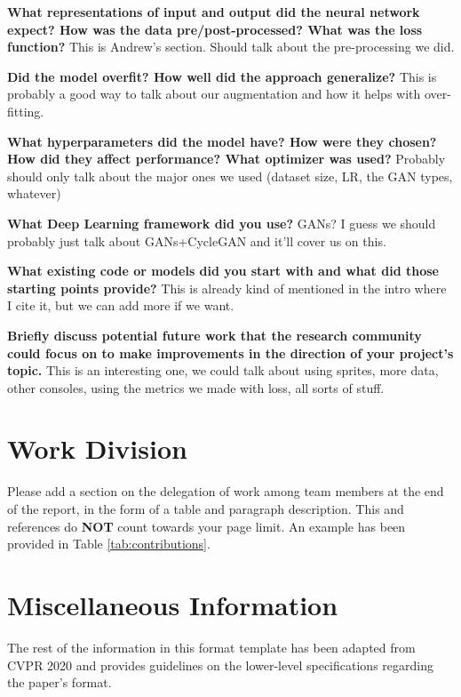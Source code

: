\documentclass[10pt,twocolumn,letterpaper]{article}
\begin{document}
\textbf{What representations of input and output did the neural network expect? How was the data pre/post-processed?
   What was the loss function?}
This is Andrew's section. Should talk about the pre-processing we did.

\textbf{Did the model overfit? How well did the approach generalize?}
This is probably a good way to talk about our augmentation and how it helps with over-fitting.

\textbf{What hyperparameters did the model have? How were they chosen? How did they affect performance? What optimizer was used?}
Probably should only talk about the major ones we used (dataset size, LR, the GAN types, whatever)

\textbf{What Deep Learning framework did you use?}
GANs? I guess we should probably just talk about GANs+CycleGAN and it'll cover us on this.

\textbf{What existing code or models did you start with and what did those starting points provide?}
This is already kind of mentioned in the intro where I cite it, but we can add more if we want.

\textbf{Briefly discuss potential future work that the research community could focus on to make improvements in the direction of your project's topic.}
This is an interesting one, we could talk about using sprites, more data, other consoles, using the metrics we made with loss, all sorts of stuff.


\section{Work Division}

Please add a section on the delegation of work among team members at the end of the report, in the form of a table and paragraph description. This and references do \textbf{NOT} count towards your page limit. An example has been provided in Table \ref{tab:contributions}.

\newpage
\newpage
\section{Miscellaneous Information}

The rest of the information in this format template has been adapted from CVPR 2020 and provides guidelines on the lower-level specifications regarding the paper's format.
\end{document}
